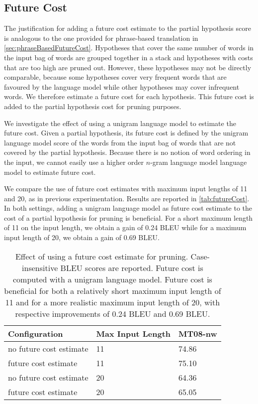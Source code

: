 \subsection{Future Cost}
\label{sec:gyroFutureCost}

The justification for adding a future cost estimate to the partial
hypothesis score is analogous to the one provided for phrase-based
translation in \autoref{sec:phraseBasedFutureCost}.
Hypotheses that
cover the same number of words in the input
bag of words are grouped together in a stack and
hypotheses with costs that are too high are pruned out.
However, these hypotheses may not be directly comparable, because
some hypotheses cover very frequent words that are favoured by the
language model while other hypotheses may cover infrequent words.
We therefore estimate a future cost for each hypothesis.
This future cost is added to the partial hypothesis cost for pruning
purposes.

We investigate the effect of using a unigram language model to estimate
the future cost. Given a partial hypothesis, its future cost is defined
by the unigram language model score of the words from the input
bag of words that are not covered by the partial hypothesis.
Because there is no notion of word ordering in the input, we
cannot easily use a higher order $n$-gram language model
language model to estimate future cost.

We compare the use of future cost estimates with maximum input lengths
of 11 and 20, as in previous experimentation. Results are reported in \autoref{tab:futureCost}.
In both settings, adding a unigram language model as
future cost estimate to the cost of a partial hypothesis for pruning is beneficial.
For a short maximum length of 11 on the input length, we
obtain a gain of 0.24 BLEU while for a maximum input length
of 20, we obtain a gain of 0.69 BLEU.
%
\begin{table}
  \begin{center}
    \begin{tabular}{l|l|l}
      Configuration & Max Input Length & MT08-nw \\
      \hline
      no future cost estimate & 11 & 74.86 \\
      future cost estimate & 11 & 75.10 \\
      \hline
      no future cost estimate & 20 & 64.36 \\
      future cost estimate & 20 & 65.05 \\
    \end{tabular}
    \caption{Effect of using a future cost estimate for pruning.
      Case-insensitive BLEU scores are reported.
      Future cost is computed with a unigram language model.
      Future cost is beneficial for both a relatively short maximum input
      length of 11 and for a more realistic maximum input length of 20, with
      respective improvements of 0.24 BLEU and 0.69 BLEU.}
    \label{tab:futureCost}
  \end{center}
\end{table}

